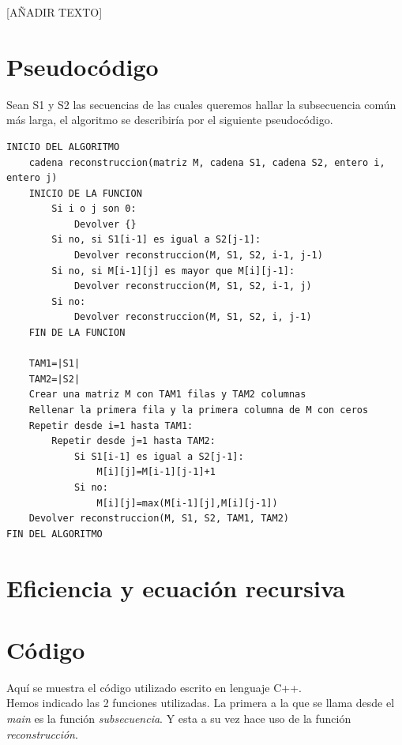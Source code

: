 \documentclass[11pt,a4paper]{article} %
\begin{document}
[AÑADIR TEXTO]\\


\newpage
\section{Pseudocódigo}
Sean S1 y S2 las secuencias de las cuales queremos hallar la subsecuencia común más larga, el algoritmo se describiría por el siguiente pseudocódigo.

\small
{}
\normalsize 	
\begin{lstlisting}
INICIO DEL ALGORITMO
    cadena reconstruccion(matriz M, cadena S1, cadena S2, entero i, entero j)
    INICIO DE LA FUNCION
        Si i o j son 0:
            Devolver {}
        Si no, si S1[i-1] es igual a S2[j-1]:
            Devolver reconstruccion(M, S1, S2, i-1, j-1)
        Si no, si M[i-1][j] es mayor que M[i][j-1]:
            Devolver reconstruccion(M, S1, S2, i-1, j)
        Si no:
            Devolver reconstruccion(M, S1, S2, i, j-1)
    FIN DE LA FUNCION
    
    TAM1=|S1|
    TAM2=|S2|
    Crear una matriz M con TAM1 filas y TAM2 columnas
    Rellenar la primera fila y la primera columna de M con ceros
    Repetir desde i=1 hasta TAM1:
        Repetir desde j=1 hasta TAM2:
            Si S1[i-1] es igual a S2[j-1]:
                M[i][j]=M[i-1][j-1]+1
            Si no:
                M[i][j]=max(M[i-1][j],M[i][j-1])
    Devolver reconstruccion(M, S1, S2, TAM1, TAM2)
FIN DEL ALGORITMO

\end{lstlisting}


\newpage
\section{Eficiencia y ecuación recursiva}



\newpage
\section{Código}
Aquí se muestra el código utilizado escrito en lenguaje C++.\\

Hemos indicado las 2 funciones utilizadas. La primera a la que se llama desde el \textit{main} es la función \textit{subsecuencia}. Y esta a su vez hace uso de la función \textit{reconstrucción}.
\end{document}
